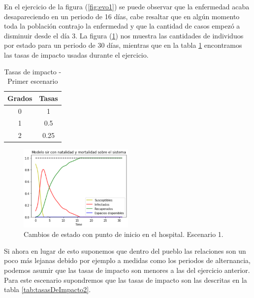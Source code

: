 En el ejercicio de la figura (\ref{fig:evo1}) se puede observar que la enfermedad acaba desapareciendo en un periodo de 16 días, cabe resaltar que en algún momento toda la población contrajo la enfermedad y que la cantidad de casos empezó a disminuir desde el día 3. La figura (\ref{fig:metricas1}) nos muestra las cantidades de individuos por estado para un periodo de 30 días, mientras que en la tabla \ref{tab:tasasDeImpacto1} encontramos las tasas de impacto usadas durante el ejercicio.

\newpage

\begin{table}[h]
\begin{center}
\begin{tabular}{| c | c |}
\hline
Grados & Tasas \\ \hline
0 & 1 \\
1 & 0.5 \\
2 & 0.25 \\\hline
\end{tabular}
\caption{Tasas de impacto - Primer escenario}
\label{tab:tasasDeImpacto1}
\end{center}
\end{table}

\begin{figure}[h]
  \centering
    \includegraphics[width=0.5\textwidth]{Imagenes/metricas1.PNG}
    \caption{Cambios de estado con punto de inicio en el hospital. Escenario 1.}
    \label{fig:metricas1}
\end{figure}

Si ahora en lugar de esto suponemos que dentro del pueblo las relaciones son un poco más lejanas debido por ejemplo a medidas como los periodos de alternancia, podemos asumir que las tasas de impacto son menores a las del ejercicio anterior. Para este escenario supondremos que las tasas de impacto son las descritas en la tabla \ref{tab:tasasDeImpacto2}.

